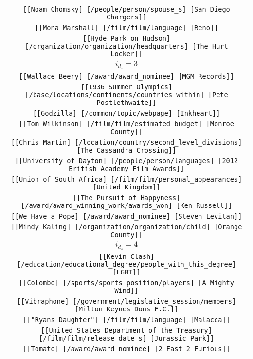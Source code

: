 \begin{longtable}{|c|}
    \texttt{[[Noam Chomsky] [/people/person/spouse\_s] [San Diego Chargers]]}\\
    \texttt{[[Mona Marshall] [/film/film/language] [Reno]]}\\
    \texttt{[[Hyde Park on Hudson] [/organization/organization/headquarters] [The Hurt Locker]]}\\
    \hline 
    \rowcolor[HTML]{EFEFEF} 
    \textsc{$i_{d_z}=3$}\\ \hline 
    \texttt{[[Wallace Beery] [/award/award\_nominee] [MGM Records]]}\\
    \texttt{[[1936 Summer Olympics] [/base/locations/continents/countries\_within] [Pete Postlethwaite]]}\\
    \texttt{[[Godzilla] [/common/topic/webpage] [Inkheart]]}\\
    \texttt{[[Tom Wilkinson] [/film/film/estimated\_budget] [Monroe County]]}\\
    \texttt{[[Chris Martin] [/location/country/second\_level\_divisions] [The Cassandra Crossing]]}\\
    \texttt{[[University of Dayton] [/people/person/languages] [2012 British Academy Film Awards]]}\\
    \texttt{[[Union of South Africa] [/film/film/personal\_appearances] [United Kingdom]]}\\
    \texttt{[[The Pursuit of Happyness] [/award/award\_winning\_work/awards\_won] [Ken Russell]]}\\
    \texttt{[[We Have a Pope] [/award/award\_nominee] [Steven Levitan]]}\\
    \texttt{[[Mindy Kaling] [/organization/organization/child] [Orange County]]}\\
    \hline 
    \rowcolor[HTML]{EFEFEF} 
    \textsc{$i_{d_z}=4$}\\ \hline 
    \texttt{[[Kevin Clash] [/education/educational\_degree/people\_with\_this\_degree] [LGBT]]}\\
    \texttt{[[Colombo] [/sports/sports\_position/players] [A Mighty Wind]]}\\
    \texttt{[[Vibraphone] [/government/legislative\_session/members] [Milton Keynes Dons F.C.]]}\\
    \texttt{[["Ryans Daughter"] [/film/film/language] [Malacca]]}\\
    \texttt{[[United States Department of the Treasury] [/film/film/release\_date\_s] [Jurassic Park]]}\\
    \texttt{[[Tomato] [/award/award\_nominee] [2 Fast 2 Furious]]}\\

\end{longtable}
